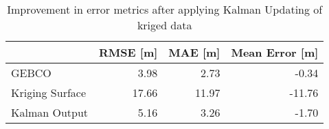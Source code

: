\begin{table}
\centering
\caption{Improvement in error metrics after applying Kalman Updating of kriged data}
\label{tab:oahu9_gebco_raster_error}
\begin{tabular}{lrrr}
\toprule
 & RMSE [m] & MAE [m] & Mean Error [m] \\
\midrule
GEBCO & 3.98 & 2.73 & -0.34 \\
Kriging Surface & 17.66 & 11.97 & -11.76 \\
Kalman Output & 5.16 & 3.26 & -1.70 \\
\bottomrule
\end{tabular}
\end{table}
